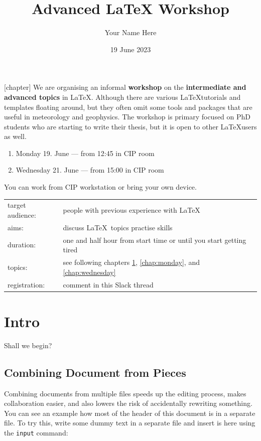 \documentclass[a4paper,10pt]{report} %
\title{Advanced LaTeX Workshop}
\author{Your Name Here}
\date{19 June 2023}
\begin{document}
[chapter]
 \thispagestyle{plain}
 \setcounter{page}{1}
 We are organising an informal \textbf{workshop} on the \textbf{intermediate and advanced topics} in \LaTeX.
Although there are various \LaTeX tutorials and templates floating around, but they often omit some tools and packages that are useful in meteorology and geophysics. The workshop is primary focused on PhD students who are starting to write their thesis, but it is open to other \LaTeX users as well.
 \begin{enumerate}
 \item  Monday 19. June --- from 12:45 in CIP room 
 \item  Wednesday 21. June --- from 15:00 in CIP room
\end{enumerate}

\noindent
You can work from CIP workstation or bring your own device.~\\

 \begin{tabular}{l p{}}
   target audience: & people with previous experience with \LaTeX \\
   aims:  & discuss \LaTeX ~topics practise skills \\
   duration: & one and half hour from start time or until you start getting tired \\
   topics: & see following chapters \ref{chap:intro}, \ref{chap:monday}, and \ref{chap:wednesday} \\
   registration: & comment in this Slack thread \\ 
 \end{tabular}

\maketitle
 
\chapter{Intro} \label{chap:intro}

\setcounter{page}{3} 

Shall we begin?

\section{Combining Document from Pieces}
Combining documents from multiple files speeds up the editing process, makes collaboration easier, and also lowers the risk of accidentally rewriting something. You can see an example how most of the header of this document is in a separate file.
To try this, write some dummy text in a separate file and insert is here using the \texttt{input} command:\\
% 
\end{document}
